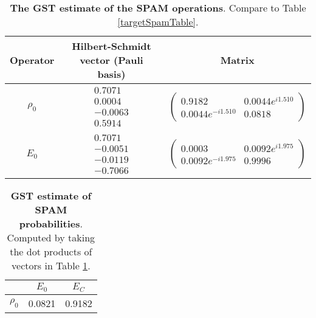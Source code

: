 {\begin{table}[h]
\begin{center}
\begin{tabular}[l]{|c|c|c|}
\hline
Operator & Hilbert-Schmidt vector (Pauli basis) & Matrix \\ \hline
$\rho_{0}$ & $ \begin{array}{c}
0.7071 \\ 
0.0004 \\ 
-0.0063 \\ 
0.5914
 \end{array} $
 & $ \left(\!\!\begin{array}{cc}
0.9182 & 0.0044e^{i1.510} \\ 
0.0044e^{-i1.510} & 0.0818
 \end{array}\!\!\right) $
 \\ \hline
$E_{0}$ & $ \begin{array}{c}
0.7071 \\ 
-0.0051 \\ 
-0.0119 \\ 
-0.7066
 \end{array} $
 & $ \left(\!\!\begin{array}{cc}
0.0003 & 0.0092e^{i1.975} \\ 
0.0092e^{-i1.975} & 0.9996
 \end{array}\!\!\right) $
 \\ \hline
\end{tabular}

\caption{\textbf{The GST estimate of the SPAM operations}.  Compare to Table \ref{targetSpamTable}.\label{bestCPTPGatesetSpamTable}}
\end{center}
\end{table}

\begin{table}[h]
\begin{center}
\begin{tabular}[l]{|c|c|c|}
\hline
 & $E_{0}$ & $E_C$ \\ \hline
$\rho_{0}$ & 0.0821 & 0.9182 \\ \hline
\end{tabular}

\caption{\textbf{GST estimate of SPAM probabilities}.  Computed by taking the dot products of vectors in Table \ref{bestCPTPGatesetSpamTable}.\label{bestCPTPGatesetSpamParametersTable}}
\end{center}
\end{table}

}
